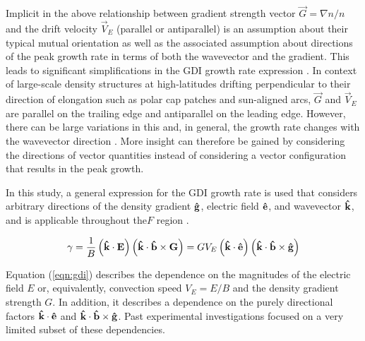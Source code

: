 Implicit in the above relationship  between gradient strength vector \(\vec{G} = \nabla n/n\) and the drift velocity \(\vec{V}_E\) (parallel or antiparallel) is an assumption about their typical mutual orientation as well as the associated assumption about directions of the peak growth rate in terms of both the wavevector and the gradient. This leads to significant simplifications in the GDI growth rate expression \citep{Linson1970,Tsunoda1988}. In context of large-scale density structures at high-latitudes drifting perpendicular to their direction of elongation \citep{Makarevitch2004c,Makarevich2015b} such as polar cap patches and sun-aligned arcs, \(\vec{G}\) and \(\vec{V}_E\) are parallel on the trailing edge and antiparallel on the leading edge. However, there can be large variations in this \citep{Makarevitch2004c} and, in general, the growth rate changes with the wavevector direction \citep{Keskinen1982a,Keskinen1983,Makarevich2014c}. More insight can therefore be gained by considering the directions of vector quantities instead of considering a vector configuration that results in the peak growth.

In this study, a general expression for the GDI growth rate is used that considers arbitrary directions of the density gradient \(\mathbf{\hat{g}}\), electric field \(\mathbf{\hat{e}}\), and wavevector \(\mathbf{\hat{k}}\), and is applicable throughout the\(F\) region \citep[Equation 23]{Makarevich2014c}.

\begin{equation}
  \label{eqn:gdi}
  \gamma = \frac{1}{B}\left(\mathbf{\hat{k}}\cdot\mathbf{E}\right)\left(\mathbf{\hat{k}}\cdot\mathbf{\hat{b}}\times\mathbf{G}\right) = GV_E\left(\mathbf{\hat{k}}\cdot\mathbf{\hat{e}}\right)\left(\mathbf{\hat{k}}\cdot\mathbf{\hat{b}}\times\mathbf{\hat{g}}\right)
\end{equation}

Equation (\ref{eqn:gdi}) describes the dependence on the magnitudes of the electric field $E$ or, equivalently, convection speed \(V_E=E/B\) and the density gradient strength \(G\). In addition, it describes a dependence on the purely directional factors \(\mathbf{\hat{k}}\cdot\mathbf{\hat{e}}\) and \(\mathbf{\hat{k}}\cdot\mathbf{\hat{b}}\times\mathbf{\hat{g}}\). Past experimental investigations focused on a very limited subset of these dependencies.

